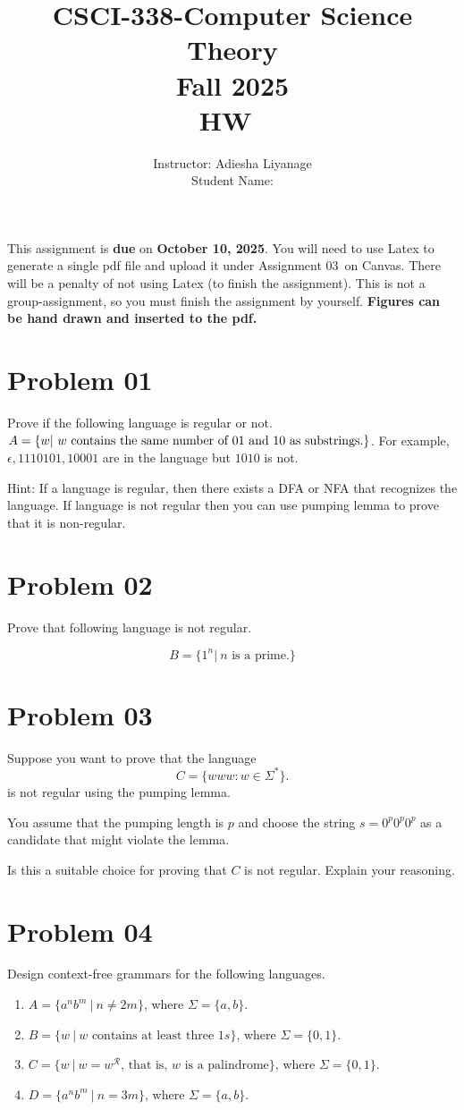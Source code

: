 \documentclass{article}
\title{CSCI-338-Computer Science Theory\\Fall 2025 \\HW~\assignmentnumber}
\author{Instructor: Adiesha Liyanage \\
Student Name: }
\date{}
\newcommand{\assignmentnumber}{03~}
\newcommand{\assignmentduedate}{October 10, 2025}
\begin{document}
\maketitle
This assignment is \textbf{due} on \textbf{\assignmentduedate}. You will need to use Latex to generate a single pdf file and upload it under Assignment \assignmentnumber on Canvas. There will be a penalty of not using Latex (to finish the assignment). This is not a group-assignment, so you must finish the assignment by yourself. \textbf{Figures can be hand drawn and inserted to the pdf.}


\section{Problem 01}
\noindent
Prove if the following language is regular or not. \(A=\{ w |~ w \text{ contains the same }\\ \text{number of 01 and 10 as substrings.}\}\). For example, \(\epsilon, 1110101, 10001\) are in the language but \(1010\) is not. 

Hint: If a language is regular, then there exists a DFA or NFA that recognizes the language. If language is not regular then you can use pumping lemma to prove that it is non-regular.


\section{Problem 02}
Prove that following language is not regular.

\[B = \{1^n |~n \text{ is a prime.}\}\]

\section{Problem 03}
Suppose you want to prove that the language
\[C = \{www: w \in \Sigma^*\}.\]
is not regular using the pumping lemma.

You assume that the pumping length is \(p\) and choose the string \(s=0^p0^p0^p\) as a candidate that might violate the lemma. 

Is this a suitable choice for proving that \(C\) is not regular. Explain your reasoning.

\section{Problem 04}
Design context-free grammars for the following languages.
\begin{enumerate}
    \item \(A = \{ a^nb^m~|~n\neq 2m\}\), where \(\Sigma = \{a,b\}\).
    \item \(B = \{ w~|~w\text{ contains at least three }1s\}\), where \(\Sigma = \{0,1\}\).
    \item \(C = \{ w~|~w=w^\mathcal{R}\text{, that is, }w\text{ is a palindrome}\}\), where \(\Sigma = \{0,1\}\).
    \item \(D = \{ a^nb^m~|~n = 3m\}\), where \(\Sigma = \{a,b\}\).
\end{enumerate}
\end{document}
